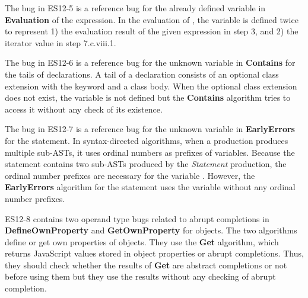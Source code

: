 The bug in ES12-5 is a reference bug for the already defined variable 
in \textbf{Evaluation} of the  expression.
  In the evaluation of , the variable  is defined twice to
represent 1) the evaluation result of the given expression  in step
3, and 2) the iterator value in step 7.c.viii.1.

The bug in ES12-6 is a reference bug for the unknown variable 
in \textbf{Contains} for the tails of  declarations.  A tail of a
 declaration consists of an optional class extension with the
 keyword and a class body.  When the
optional class extension does not exist, the variable  is not
defined but the \textbf{Contains} algorithm tries to access it without any check
of its existence.

The bug in ES12-7 is a reference bug for the unknown variable  in
\textbf{EarlyErrors} for the  statement.  In syntax-directed algorithms,
when a production produces multiple sub-ASTs, it uses ordinal numbers as prefixes of variables.
Because the  statement contains two sub-ASTs
produced by the \textit{Statement} production, the ordinal number prefixes
are necessary for the variable .  However, the
\textbf{EarlyErrors} algorithm for the  statement uses the variable without any
ordinal number prefixes.

ES12-8 contains two operand type bugs related to abrupt completions in
\textbf{DefineOwnProperty} and \textbf{GetOwnProperty} for  objects.
The two algorithms define or get own properties of  objects.
They use the \textbf{Get} algorithm, which returns JavaScript
values stored in object properties or abrupt completions.
Thus, they should check whether the results of \textbf{Get} are abstract completions or not
before using them but they use the results without any checking of abrupt completion.
